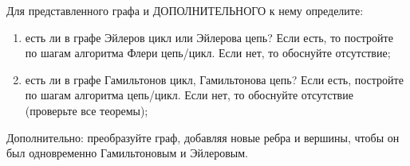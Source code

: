 \question
Для представленного графа и ДОПОЛНИТЕЛЬНОГО к нему определите:
\begin{enumerate}
\item есть ли в графе Эйлеров цикл или Эйлерова цепь? Если есть, то постройте по шагам алгоритма Флери цепь/цикл. Если нет, то обоснуйте отсутствие;
\item есть ли в графе Гамильтонов цикл, Гамильтонова цепь? Если есть, постройте по шагам алгоритма цепь/цикл. Если нет, то обоснуйте отсутствие (проверьте все теоремы);
\end{enumerate}
Дополнительно: преобразуйте граф, добавляя новые ребра и вершины, чтобы он был одновременно Гамильтоновым и Эйлеровым.
\begin{figure}[h]

\begin{minipage}[h]{0.55\linewidth}
\end{minipage}
\begin{minipage}[h]{0.45\linewidth}
\end{minipage}
\end{figure}
